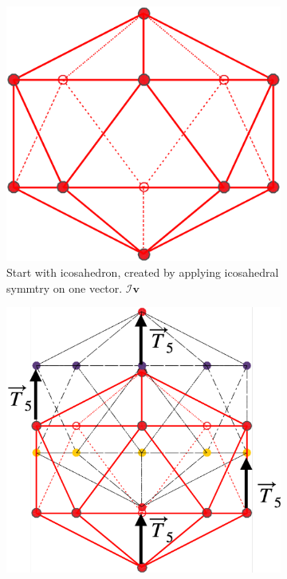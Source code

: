 \documentclass[a4paper,10pt]{article}
\theoremstyle{plain}
\theoremstyle{definition}
\theoremstyle{remark}
\renewcommand{\vec}[1]{\textbf{#1}}
\begin{document}
\begin{figure}[h]
	\centering
	\begin{subfigure}{0.25\textwidth}
		\centering
		\includegraphics[width=\textwidth]{images/p_arr_construction_1.pdf}
		\caption{Start with icosahedron, created by applying icosahedral symmtry on one vector. \(\mathcal{I}\vec{v}\)}
	\end{subfigure}
	\hfill
	\begin{subfigure}{0.3\textwidth}
		\centering
		\includegraphics[width=\textwidth]{images/p_arr_construction_2.pdf}

\end{subfigure}
\end{figure}
\end{document}
